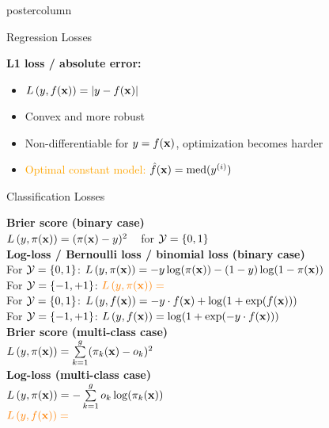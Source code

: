 \documentclass{beamer}
\begin{document}
\begin{frame}[fragile]{}
\begin{columns}
\begin{column}{.31\textwidth}
\begin{beamercolorbox}[center]{postercolumn}
\begin{minipage}{.98\textwidth}
{\begin{myblock}{Regression Losses}
\vspace*{1ex}


  \textbf{L1 loss / absolute error:} 
\begin{itemize}
\setlength{\itemindent}{+.3in}
  \item $L\left(y, f(\mathbf{x})\right) = |y-f(\mathbf{x})|$
  \item Convex and more robust
  \item Non-differentiable for $y = f(\mathbf{x})$, optimization becomes harder
  \item \textcolor{orange}{Optimal constant model: $\hat{f}(\mathbf{x}) = \text{med}(y^{(i)})$}
\end{itemize}
\end{myblock}


\begin{myblock}{Classification Losses}


\textbf{Brier score (binary case)} \\
$L\left(y, \pi(\mathbf{x})\right) = (\pi(\mathbf{x}) - y)^2$ ~ for $\mathcal{Y} = \{0, 1\}$ \\

\textbf{Log-loss / Bernoulli loss / binomial loss (binary case)}\\
For $\mathcal{Y} = \{0, 1\}$: $L\left(y, \pi(\mathbf{x})\right) = -y \log(\pi(\mathbf{x})) - (1-y) \log(1-\pi(\mathbf{x}))$ \\
For $\mathcal{Y} = \{-1, +1\}$: $\textcolor{orange}{L\left(y, \pi(\mathbf{x})\right) = }$ \\
For $\mathcal{Y} = \{0, 1\}$: $L\left(y, f(\mathbf{x})\right) = -y \cdot f(\mathbf{x}) + \log(1 + \exp(f(\mathbf{x})))$ \\
For $\mathcal{Y} = \{-1, +1\}$: $L\left(y, f(\mathbf{x})\right) = \log(1 + \exp(- y \cdot f(\mathbf{x})))$ \\

\textbf{Brier score (multi-class case)} \\
$L\left(y, \pi(\mathbf{x})\right) =  \sum\limits_{k=1}^g (\pi_{k}(\mathbf{x}) - o_k)^2$ \\

\textbf{Log-loss (multi-class case)} \\
$ L\left(y, \pi(\mathbf{x})\right) =  - \sum\limits_{k=1}^g o_k \log(\pi_{k}(\mathbf{x}))$  \\
$\textcolor{orange}{L\left(y, f(\mathbf{x})\right) = }$
\end{myblock}

}
\end{minipage}
\end{beamercolorbox}
\end{column}
\end{columns}
\end{frame}
\end{document}
